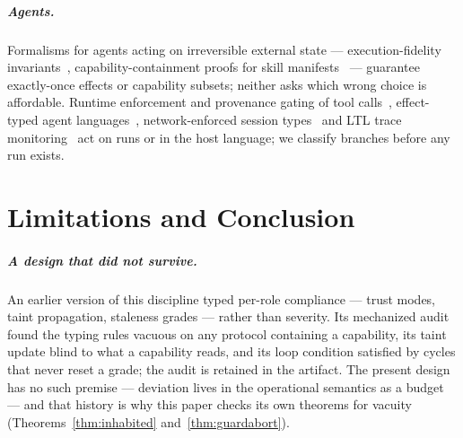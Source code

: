 \documentclass[a4paper,UKenglish,cleveref,autoref,thm-restate,anonymous]{lipics-v2021}
\begin{document}
\subparagraph*{Agents.} Formalisms for agents acting on irreversible external
state --- execution-fidelity invariants~\cite{yin-fidelity},
capability-containment proofs for skill manifests~\cite{metere-skills} ---
guarantee exactly-once effects or capability subsets; neither asks which wrong
choice is affordable. Runtime enforcement and provenance gating of tool
calls~\cite{agentspec,camel,fides,progent}, effect-typed agent
languages~\cite{etas}, network-enforced session types~\cite{nest-ecoop26} and
LTL trace monitoring~\cite{trac-facct26,agentltl} act on runs or in the host
language; we classify branches before any run exists.

\section{Limitations and Conclusion}\label{sec:conclusion}

\subparagraph*{A design that did not survive.}\label{sec:whatchanged} An earlier
version of this discipline typed per-role compliance --- trust modes, taint
propagation, staleness grades --- rather than severity. Its mechanized audit
found the typing rules vacuous on any protocol containing a capability, its
taint update blind to what a capability reads, and its loop condition satisfied
by cycles that never reset a grade; the audit is retained in the artifact. The
present design has no such premise --- deviation lives in the operational
semantics as a budget --- and that history is why this paper checks its own
theorems for vacuity (Theorems~\ref{thm:inhabited} and~\ref{thm:guardabort}).
\end{document}

